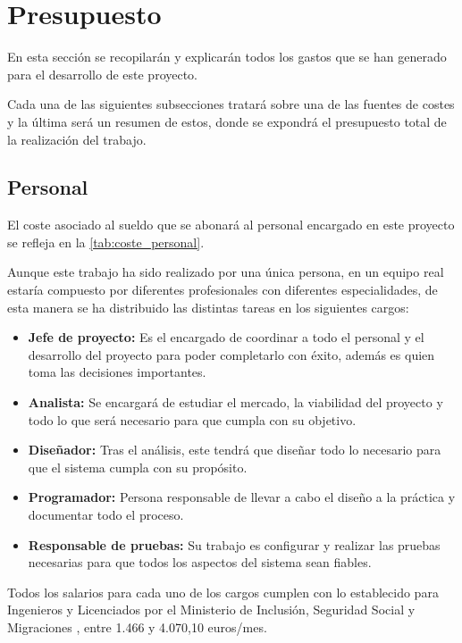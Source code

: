 \section{Presupuesto}
En esta sección se recopilarán y explicarán todos los gastos que se han generado para el desarrollo de este proyecto.

Cada una de las siguientes subsecciones tratará sobre una de las fuentes de costes y la última será un resumen de estos, donde se expondrá el presupuesto total de la realización del trabajo.

\subsection{Personal}
El coste asociado al sueldo que se abonará al personal encargado en este proyecto se refleja en la \autoref{tab:coste_personal}.

Aunque este trabajo ha sido realizado por una única persona, en un equipo real estaría compuesto por diferentes profesionales con diferentes especialidades, de esta manera se ha distribuido las distintas tareas en los siguientes cargos:
\begin{itemize}
	\item \textbf{Jefe de proyecto:} Es el encargado de coordinar a todo el personal y el desarrollo del proyecto para poder completarlo con éxito, además es quien toma las decisiones importantes.
	\item \textbf{Analista:} Se encargará de estudiar el mercado, la viabilidad del proyecto y todo lo que será necesario para que cumpla con su objetivo.
	\item \textbf{Diseñador:} Tras el análisis, este tendrá que diseñar todo lo necesario para que el sistema cumpla con su propósito.
	\item \textbf{Programador:} Persona responsable de llevar a cabo el diseño a la práctica y documentar todo el proceso.
	\item \textbf{Responsable de pruebas:} Su trabajo es configurar y realizar las pruebas necesarias para que todos los aspectos del sistema sean fiables.
\end{itemize}

Todos los salarios para cada uno de los cargos cumplen con lo establecido para Ingenieros y Licenciados por el Ministerio de Inclusión, Seguridad Social y Migraciones \cite{noauthor_seguridad_nodate}, entre 1.466 y 4.070,10 euros/mes.

